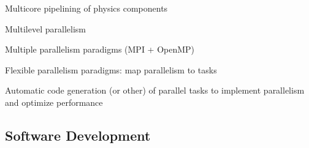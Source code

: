 \documentclass{article}
\begin{document}
Multicore pipelining of physics components


Multilevel parallelism

Multiple parallelism paradigms (MPI + OpenMP)

Flexible parallelism paradigms: map parallelism to tasks

Automatic code generation (or other) of parallel tasks to implement
parallelism and optimize performance


\subsection{Software Development}
\end{document}

